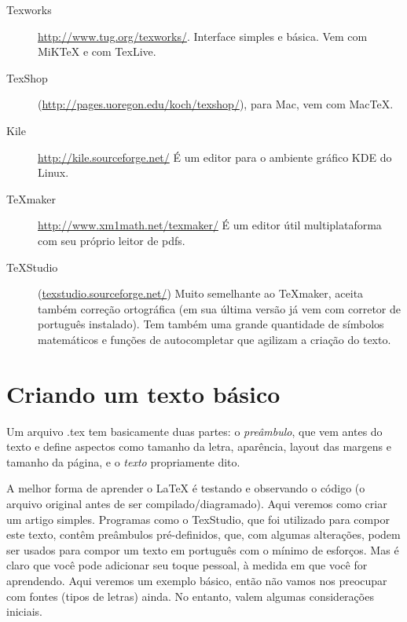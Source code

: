 \documentclass[a4paper,numbers=noenddot,abstract,DIV=calc]{scrbook} %
\begin{document}
\begin{description}

\item[Texworks] \url{http://www.tug.org/texworks/}. Interface simples e básica. Vem com MiKTeX e com TexLive.

\item [TexShop] (\url{http://pages.uoregon.edu/koch/texshop/}), para Mac, vem com MacTeX.

\item [Kile] \url{http://kile.sourceforge.net/}
É um editor para o ambiente gráfico KDE do Linux.

\item [TeXmaker] \url{http://www.xm1math.net/texmaker/}
É um editor útil multiplataforma com seu próprio leitor de pdfs.

\item  [TeXStudio] (\url{texstudio.sourceforge.net/})
Muito semelhante ao TeXmaker, aceita também correção ortográfica (em sua última versão já vem com corretor de português instalado). Tem também uma grande quantidade de símbolos matemáticos e funções de autocompletar que agilizam a criação do texto.

\end{description}

\chapter{Criando um texto básico}

Um arquivo .tex tem basicamente duas partes: o \textit{preâmbulo}, que vem antes do texto e define aspectos como tamanho da letra, aparência, layout das margens e tamanho da página, e o \textit{texto} propriamente dito.

A melhor forma de aprender o \LaTeX{} é testando e observando o código (o arquivo original antes de ser compilado/diagramado). Aqui veremos como criar um artigo simples. Programas como o TexStudio, que foi utilizado para compor este texto, contêm preâmbulos pré-definidos, que, com algumas alterações, podem ser usados para compor um texto em português com o mínimo de esforços. Mas é claro que você pode adicionar seu toque pessoal, à medida em que você for aprendendo. Aqui veremos um exemplo básico, então não vamos nos preocupar com fontes (tipos de letras) ainda. No entanto, valem algumas considerações iniciais.
\end{document}
